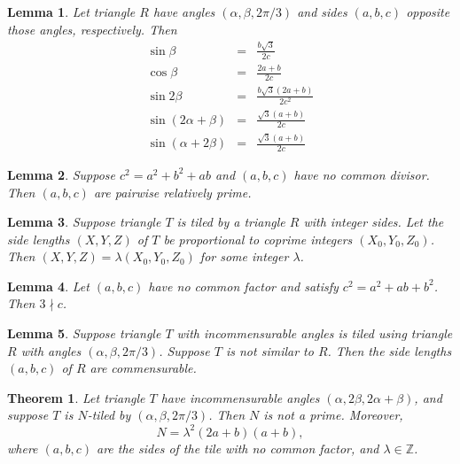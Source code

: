 \documentclass[10pt,a4paper]{amsart}
\newtheorem{lemma}{Lemma}
\newtheorem{theorem}{Theorem}
\def\Z{{\mathbb Z}}
\begin{document}
\begin{lemma}\label{lemma:beta}
Let triangle $R$ have angles $(\alpha,\beta,2\pi/3)$ and sides $(a,b,c)$ opposite
those angles, respectively. Then
\begin{eqnarray*}
\sin \beta &=& \frac{b \sqrt 3}{2c}\\
\cos \beta &=& \frac {2a+b}{2c}\\
\sin 2 \beta &=& \frac {b \sqrt 3 (2a+b)}{2c^2}\\
\sin (2 \alpha +\beta) &=& \frac{\sqrt 3 (a+b)}{2c} \\
\sin (\alpha + 2 \beta)&=&\frac{\sqrt 3 (a+b)}{2c} 
\end{eqnarray*}
\end{lemma}

\begin{lemma} \label{lemma:pairwisecoprimality} Suppose $c^2 = a^2 + b^2 + ab$ and 
$(a,b,c)$ have no common divisor.  Then $(a,b,c)$ are pairwise relatively prime.
\end{lemma}

\begin{lemma} \label{lemma:claude3}
Suppose triangle $T$ is tiled by a triangle $R$ with integer sides.
 Let the side lengths 
$(X,Y,Z)$ of $T$ be proportional to coprime integers $(X_0, Y_0, Z_0)$.
Then $(X,Y,Z) = \lambda (X_0,Y_0,Z_0)$ for some integer $\lambda$.
\end{lemma}

\begin{lemma} \label{lemma:not3divc} Let $(a,b,c)$ have no common factor
and satisfy $c^2 = a^2 + ab + b^2$.  Then $3 \nmid c$.
\end{lemma}

\begin{lemma}\label{lemma:rationality3}
Suppose triangle $T$ with incommensurable angles is tiled using triangle $R$ with angles $(\alpha, \beta, 2\pi/3)$.
Suppose $T$ is not similar to $R$.
Then the side lengths $(a,b,c)$ of $R$ are commensurable.
\end{lemma}

\begin{theorem} \label{theorem:case3}  Let triangle $T$ have incommensurable angles 
$(\alpha, 2\beta, 2\alpha + \beta)$, and suppose $T$ is $N$-tiled by $(\alpha,\beta,2\pi/3)$.
Then $N$ is not a prime.  Moreover,
$$ N = \lambda^2 (2a+b) (a+b),$$
where $(a,b,c)$ are the sides of the tile with no common factor, and $\lambda \in \Z$.
\end{theorem}
\end{document}
